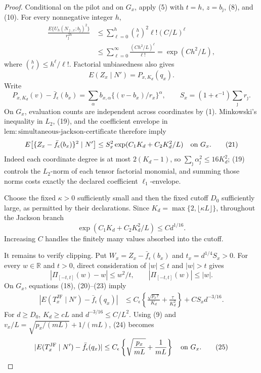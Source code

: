 \documentclass{article}
\begin{document}
\begin{proof}
Conditional on the pilot and on \(G_x\), apply (5) with \(t=h\), \(z=b_\jmath\), (8), and (10).  For every nonnegative integer \(h\),
\[
 \begin{split}
 \frac{E\{U_h(N_{\jmath,x};b_\jmath)^2\}}{r_\jmath^{2h}}
 &\leq\sum_{\ell=0}^h\binom h\ell^2\ell!(C/L)^\ell\\
 &\leq\sum_{\ell=0}^{\infty}\frac{(Ch^2/L)^\ell}{\ell!}
 =\exp(Ch^2/L),
 \end{split}                                                       \tag{19}
\]
where \(\binom h\ell\leq h^\ell/\ell!\).  Factorial unbiasedness also gives
\[
 E(Z_x\mid N')=P_{x,K_d}(q_x).                                    \tag{20}
\]
Write
\[
 P_{x,K_d}(v)-\bar f_\epsilon(b_x)
 =\sum_\alpha b_{x,\alpha}\{(v-b_x)/r_x\}^\alpha,
 \qquad
 S_x=(1+\epsilon^{-1})\sum_\jmath r_\jmath.
\]
On \(G_x\), evaluation counts are independent across coordinates by (1).  Minkowski's inequality in \(L_2\), (19), and the coefficient envelope in \(\mathrm{lem:simultaneous\mbox{-}jackson\mbox{-}certificate}\) therefore imply
\[
 E\!\left[\{Z_x-\bar f_\epsilon(b_x)\}^2\mid N'\right]
 \leq S_x^2\exp(C_1K_d+C_2K_d^2/L)
 \quad\hbox{on }G_x.                                               \tag{21}
\]
Indeed each coordinate degree is at most \(2(K_d-1)\), so \(\sum_\jmath\alpha_\jmath^2\leq16K_d^2\); (19) controls the \(L_2\)-norm of each tensor factorial monomial, and summing those norms costs exactly the declared coefficient \(\ell_1\)-envelope.

Choose the fixed \(\kappa>0\) sufficiently small and then the fixed cutoff \(D_0\) sufficiently large, as permitted by their declarations.  Since \(K_d=\max\{2,\lfloor\kappa L\rfloor\}\), throughout the Jackson branch
\[
 \exp(C_1K_d+C_2K_d^2/L)\leq C d^{1/16}.                           \tag{22}
\]
Increasing \(C\) handles the finitely many values absorbed into the cutoff.

It remains to verify clipping.  Put \(W_x=Z_x-\bar f_\epsilon(b_x)\) and \(t_x=d^{1/4}S_x>0\).  For every \(w\in\mathbb R\) and \(t>0\), direct consideration of \(|w|\leq t\) and \(|w|>t\) gives
\[
 |\Pi_{[-t,t]}(w)-w|\leq w^2/t,
 \qquad |\Pi_{[-t,t]}(w)|\leq|w|.                                \tag{23}
\]
On \(G_x\), equations (18), (20)--(23) imply
\[
 \begin{split}
 |E(T_x^{\mathrm{JF}}\mid N')-\bar f_\epsilon(q_x)|
 &\leq C_\epsilon\left\{
 \frac{\sqrt{p_x\tau}}{K_d}+\frac{\tau}{K_d^2}\right\}
   +CS_xd^{-3/16}.
 \end{split}                                                       \tag{24}
\]
For \(d\geq D_0\), \(K_d\geq cL\) and \(d^{-3/16}\leq C/L^2\).  Using (9) and \(v_x/L=\sqrt{p_x/(mL)}+1/(mL)\), (24) becomes
\[
 |E(T_x^{\mathrm{JF}}\mid N')-\bar f_\epsilon(q_x)|
 \leq C_\epsilon\left\{\sqrt{\frac{p_x}{mL}}+\frac1{mL}\right\}
 \quad\hbox{on }G_x.                                              \tag{25}
\]


\end{proof}
\end{document}
